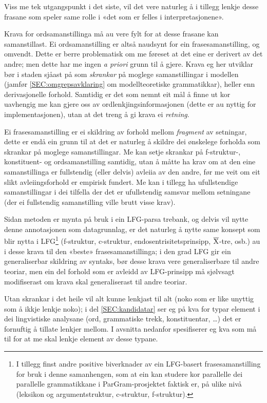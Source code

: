 \documentclass[11pt,a4paper,oneside,draft]{book}
\newcommand{\xbar}{$\rm\overline{X}$}
\begin{document}
Viss me tek utgangspunkt i det siste, vil det vere naturleg å i
tillegg lenkje desse frasane som speler same rolle i «det som er
felles i interpretasjonene».

Krava for ordsamanstillinga må au vere fylt for at desse frasane kan
samanstillast. Ei ordsamanstilling er altså naudsynt for ein
frasesamanstilling, og omvendt. Dette er berre problematisk om me
føreset at det eine er derivert av det andre; men dette har me ingen
\emph{a priori} grunn til å gjere. Krava eg her utviklar bør i staden
sjåast på som \emph{skrankar} på moglege samanstillingar i modellen (jamfør
\ref{SEC:omgrepsavklaring} om modellteoretiske grammatikkar), heller
enn derivasjonelle forhold. Samtidig er det som nemnt eit mål å finne
ut kor uavhengig me kan gjere oss av ordlenkjingsinformasjonen (dette
er au nyttig for implementasjonen), utan at det treng å gi krava ei
\emph{retning}.

Ei frasesamanstilling er ei skildring av forhold mellom \emph{fragment} av
setningar, dette er endå ein grunn til at det er naturleg å skildre
dei ønskelege forholda som skrankar på moglege samanstillingar. Me kan
setje skrankar på f-struktur-, konstituent- og ordsamanstilling
samtidig, utan å måtte ha krav om at den eine samanstillinga er
fullstendig (eller delvis) avleiia av den andre, før me veit om eit
slikt avleiingsforhold er empirisk fundert. Me kan i tillegg ha
ufullstendige samanstillingar i dei tilfella der det er ufullstendig
samsvar mellom setningane (der ei fullstendig samanstilling ville
brutt visse krav).

Sidan metoden er mynta på bruk i ein LFG-parsa trebank, og delvis vil
nytte denne annotasjonen som datagrunnlag, er det naturleg å nytte
same konsept som blir nytta i LFG\footnote{I tillegg finst andre positive biverknader av ein LFG-basert
       frasesamanstilling for bruk i denne samanhengen, som at ein kan
       studere kor parallelle dei parallelle grammatikkane i
       ParGram-prosjektet \citep{butt2002pgp} faktisk er, på ulike
       nivå (leksikon og argumentstruktur, c-struktur, f-struktur). } (f-struktur, c-struktur,
endosentrisitetsprinsipp, \xbar{}-tre, osb.)  au i desse krava til den
«beste» frasesamanstillinga; i den grad LFG gir ein generaliserbar
skildring av syntaks, bør desse krava vere generaliserbare til andre
teoriar, men ein del forhold som er avleidd av LFG-prinsipp må
sjølvsagt modifiserast om krava skal generaliserast til andre teoriar.

Utan skrankar i det heile vil alt kunne lenkjast til alt (noko som er
like unyttig som å ikkje lenkje noko); i del \ref{SEC:kandidatar} ser
eg på kva for typar element i dei lingvistiske analysane (ord,
grammatiske trekk, konstituentar, \ldots{}) det er fornuftig å tillate
lenkjer mellom. I avsnitta nedanfor spesifiserer eg kva som må til for
at me skal lenkje element av desse typane.
\end{document}
